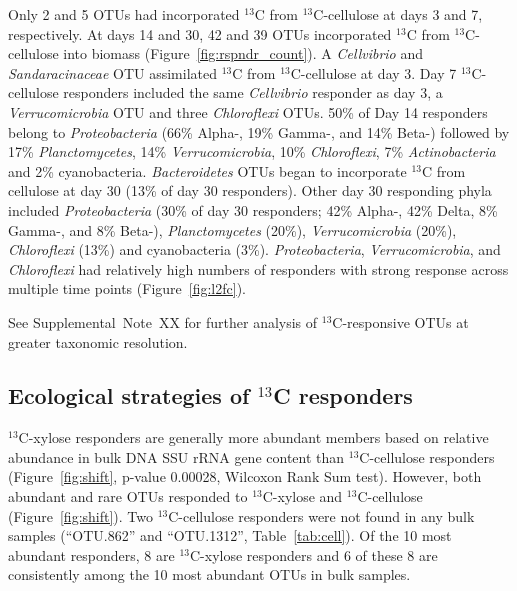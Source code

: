 Only 2 and 5 OTUs had incorporated $^{13}$C from
$^{13}$C-cellulose at days 3 and 7, respectively. At days 14 and 30,
42 and 39 OTUs incorporated $^{13}$C from $^{13}$C-cellulose into
biomass (Figure~\ref{fig:rspndr_count}). A \textit{Cellvibrio} and
\textit{Sandaracinaceae} OTU assimilated $^{13}$C from $^{13}$C-cellulose at
day 3. Day 7 $^{13}$C-cellulose responders
included the same \textit{Cellvibrio} responder as day 3,
a \textit{Verrucomicrobia} OTU and three \textit{Chloroflexi} OTUs.  50\% of
Day 14 responders belong to \textit{Proteobacteria} (66\% Alpha-, 19\% Gamma-,
and 14\% Beta-) followed by 17\% \textit{Planctomycetes}, 14\%
\textit{Verrucomicrobia}, 10\% \textit{Chloroflexi}, 7\%
\textit{Actinobacteria} and 2\% cyanobacteria. \textit{Bacteroidetes} OTUs
began to incorporate $^{13}$C from cellulose at day
30 (13\% of day 30 responders). Other day 30 responding phyla included
\textit{Proteobacteria} (30\% of day 30 responders; 42\% Alpha-, 42\% Delta,
8\% Gamma-, and 8\% Beta-), \textit{Planctomycetes} (20\%),
\textit{Verrucomicrobia} (20\%), \textit{Chloroflexi} (13\%) and
cyanobacteria (3\%). \textit{Proteobacteria}, \textit{Verrucomicrobia}, and
\textit{Chloroflexi} had relatively high numbers of responders with strong
response across multiple time points (Figure~\ref{fig:l2fc}).

See Supplemental~Note~XX for further analysis of $^{13}$C-responsive OTUs at
greater taxonomic resolution.

\subsection{Ecological strategies of $^{13}$C responders}
$^{13}$C-xylose responders are generally more abundant members based on
relative abundance in bulk DNA SSU rRNA gene content than $^{13}$C-cellulose
responders (Figure~\ref{fig:shift}, p-value 0.00028, Wilcoxon Rank Sum test).
However, both abundant and rare OTUs responded to $^{13}$C-xylose and
$^{13}$C-cellulose (Figure~\ref{fig:shift}). Two $^{13}$C-cellulose responders
were not found in any bulk samples (``OTU.862'' and ``OTU.1312'',
Table~\ref{tab:cell}). Of the 10 most abundant responders, 8 are
$^{13}$C-xylose responders and 6 of these 8 are consistently among the 10 most
abundant OTUs in bulk samples.

